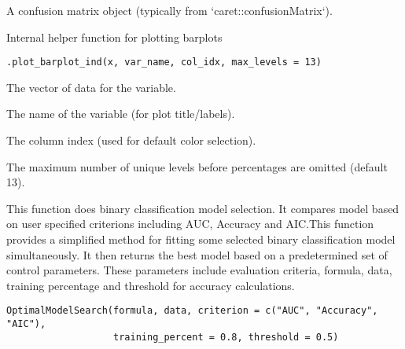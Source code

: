 \documentclass[a4paper]{book}
\begin{document}
%
\begin{Arguments}
\begin{ldescription}
\item[\code{cm}] A confusion matrix object (typically from `caret::confusionMatrix`).
\end{ldescription}
\end{Arguments}
%
\begin{Description}
Internal helper function for plotting barplots
\end{Description}
%
\begin{Usage}
\begin{verbatim}
.plot_barplot_ind(x, var_name, col_idx, max_levels = 13)
\end{verbatim}
\end{Usage}
%
\begin{Arguments}
\begin{ldescription}
\item[\code{x}] The vector of data for the variable.

\item[\code{var\_name}] The name of the variable (for plot title/labels).

\item[\code{col\_idx}] The column index (used for default color selection).

\item[\code{max\_levels}] The maximum number of unique levels before percentages are omitted (default 13).
\end{ldescription}
\end{Arguments}
%
\begin{Description}
This function  does binary classification model selection. It compares model based on user specified criterions including AUC, Accuracy and AIC.This function provides a simplified method for fitting some selected binary classification model simultaneously. It then returns the best model based on a predetermined set of control parameters. These parameters include evaluation criteria, formula, data, training percentage and threshold for accuracy calculations.
\end{Description}
%
\begin{Usage}
\begin{verbatim}
OptimalModelSearch(formula, data, criterion = c("AUC", "Accuracy", "AIC"),
                   training_percent = 0.8, threshold = 0.5)

\end{verbatim}
\end{Usage}
\end{document}
